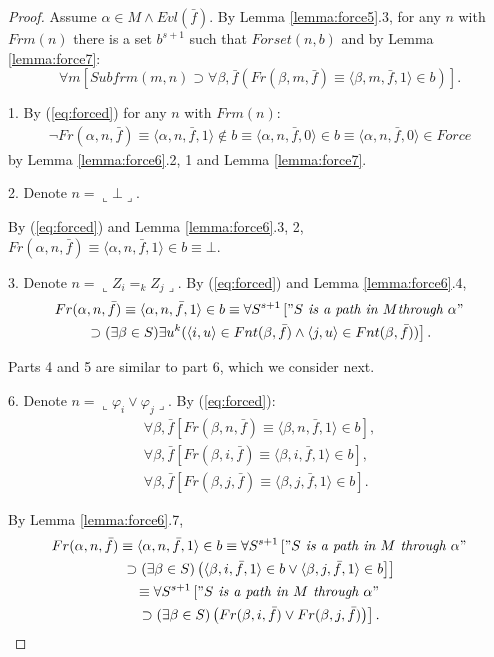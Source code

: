 \documentclass{asl}
\theoremstyle{definition}
\begin{document}
\begin{proof}
Assume $\alpha\in M\wedge Evl(\bar{f})$. By Lemma \ref{lemma:force5}.3, for any $n$ with $Frm(n)$ there is a set $b^{s+1}$ such that $Forset(n,b)$ and by Lemma \ref{lemma:force7}:
\begin{equation}
\forall m \left[Subfrm(m,n)\supset\forall\beta, \bar{f}(Fr(\beta,m,\bar{f})\equiv\langle\beta,m,\bar{f},1\rangle\in b) \right].
\label{eq:forced}
\end{equation}

1. By (\ref{eq:forced}) for any $n$ with $Frm(n)$:
\begin{multline*}
\neg Fr(\alpha,n,\bar{f})\equiv\langle\alpha,n,\bar{f},1\rangle\notin b\equiv\langle\alpha,n,\bar{f},0\rangle\in b
\equiv\langle\alpha,n,\bar{f},0\rangle\in Force
\end{multline*}
by Lemma \ref{lemma:force6}.2, 1 and Lemma \ref{lemma:force7}.

2. Denote $n=\llcorner\bot\lrcorner$. 

By  (\ref{eq:forced}) and Lemma \ref{lemma:force6}.3, 2, $Fr(\alpha,n,\bar{f})\equiv\langle\alpha,n,\bar{f},1\rangle\in b\equiv\bot$.

3. Denote $n=\llcorner Z_i=_k Z_j \lrcorner$. By (\ref{eq:forced}) and Lemma \ref{lemma:force6}.4, 
\begin{multline*}
Fr(\alpha,n,\bar{f})\equiv\langle\alpha,n,\bar{f},1\rangle\in b\equiv
\forall S^{s+1}\left["S\textit{ is a path in }M
\textit{through }\alpha" 
\right.
\\
\left.
\supset(\exists\beta\in S)\exists u^k
(\langle i,u\rangle\in Fnt(\beta,\bar{f})\wedge\langle j,u\rangle\in Fnt(\beta,\bar{f}))\right]. 
\end{multline*} 

Parts 4 and 5 are similar to part 6, which we consider next.

6. Denote $n=\llcorner \varphi_i\vee \varphi_j \lrcorner$. By (\ref{eq:forced}):
\begin{eqnarray*}
\forall\beta,\bar{f} \left[Fr(\beta,n,\bar{f})\equiv\langle \beta,n,\bar{f},1\rangle\in b\right] ,
\\
\forall\beta,\bar{f} \left[Fr(\beta,i,\bar{f})\equiv\langle \beta,i,\bar{f},1\rangle\in b\right],
\\
\forall\beta,\bar{f} \left[Fr(\beta,j,\bar{f})\equiv\langle \beta,j,\bar{f},1\rangle\in b\right].
\end{eqnarray*}

By Lemma \ref{lemma:force6}.7,
\begin{multline*}
Fr(\alpha,n,\bar{f})
\equiv \langle \alpha,n,\bar{f},1\rangle \in b\equiv
\forall S^{s+1}\left["S\textit{ is a path in }M\textit{ through }\alpha" 
\right.
\\
\left.
\supset(\exists\beta\in S)\left(\langle \beta,i,\bar{f},1\rangle \in b\vee\langle \beta,j,\bar{f},1\rangle \in b \right]
\right]
\\
\equiv
\forall S^{s+1}\left["S\textit{ is a path in }M\textit{ through }\alpha" 
\right.
\\
\left.
\supset(\exists\beta\in S)\left(Fr(\beta,i,\bar{f})\vee Fr(\beta,j,\bar{f})\right)  \right].
\end{multline*} 


\end{proof}
\end{document}
